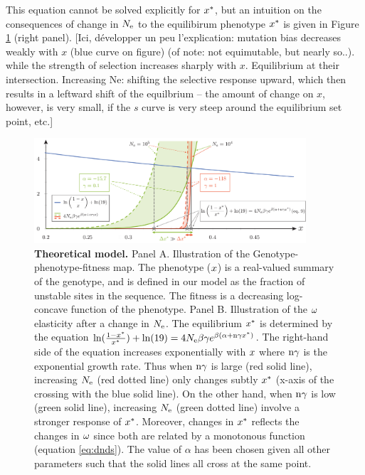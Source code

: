 \documentclass{article}
\begin{document}
	This equation cannot be solved explicitly for $x^{*}$, but an intuition on the consequences of change in $N_{\mathrm{e}}$ to the equilibirum phenotype $x^{*}$ is given in Figure \ref{fig:NeChangeInfluence} (right panel). [Ici, développer un peu l'explication: mutation bias decreases weakly with $x$ (blue curve on figure) (of note: not equimutable, but nearly so..). while the strength of selection increases sharply with $x$. Equilibrium at their intersection. Increasing Ne: shifting the selective response upward, which then results in a leftward shift of the equilbrium -- the amount of change on $x$, however, is very small, if the $s$ curve is very steep around the equilibrium set point, etc.]
	
	
	\begin{figure}[htb!]
		\begin{mdframed}
			\centering
			\includegraphics[width=0.9\textwidth, page=1] {artworks/theoretical.pdf}
			\caption{
				\textbf{Theoretical model.}
				Panel A. Illustration of the Genotype-phenotype-fitness map. The phenotype ($x$) is a real-valued summary of the genotype, and is defined in our model as the fraction of unstable sites in the sequence. The fitness is a decreasing log-concave function of the phenotype.
				Panel B. Illustration of the $\omega$ elasticity after a change in $N_{\mathrm{e}}$. The equilibrium $x^{*}$ is determined by the equation $\ln(\frac{1 - x^{*}}{x^{*}}) + \ln(19)=4N_{\mathrm{e}} \beta \gamma e^{\beta (\alpha + \text{n} \gamma x^{*})}$. The right-hand side of the equation increases exponentially with $x$ where $\text{n} \gamma$ is the exponential growth rate. Thus when $\text{n} \gamma$ is large (red solid line), increasing $N_{\mathrm{e}}$ (red dotted line) only changes subtly $x^{*}$ (x-axis of the crossing with the blue solid line). On the other hand, when $\text{n} \gamma$ is low (green solid line), increasing $N_{\mathrm{e}}$ (green dotted line) involve a stronger response of $x^{*}$. Moreover, changes in $x^{*}$ reflects the changes in $\omega$ since both are related by a monotonous function (equation \ref{eq:dnds}). The value of $\alpha$ has been chosen given all other parameters such that the solid lines all cross at the same point.
			}
			\label{fig:NeChangeInfluence}
		\end{mdframed}
	\end{figure}
	
\end{document}
